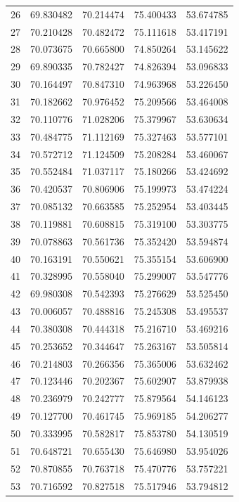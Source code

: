 \begin{table}
\begin{tabular}{rrrrr}
26 & 69.830482 & 70.214474 & 75.400433 & 53.674785 \\
27 & 70.210428 & 70.482472 & 75.111618 & 53.417191 \\
28 & 70.073675 & 70.665800 & 74.850264 & 53.145622 \\
29 & 69.890335 & 70.782427 & 74.826394 & 53.096833 \\
30 & 70.164497 & 70.847310 & 74.963968 & 53.226450 \\
31 & 70.182662 & 70.976452 & 75.209566 & 53.464008 \\
32 & 70.110776 & 71.028206 & 75.379967 & 53.630634 \\
33 & 70.484775 & 71.112169 & 75.327463 & 53.577101 \\
34 & 70.572712 & 71.124509 & 75.208284 & 53.460067 \\
35 & 70.552484 & 71.037117 & 75.180266 & 53.424692 \\
36 & 70.420537 & 70.806906 & 75.199973 & 53.474224 \\
37 & 70.085132 & 70.663585 & 75.252954 & 53.403445 \\
38 & 70.119881 & 70.608815 & 75.319100 & 53.303775 \\
39 & 70.078863 & 70.561736 & 75.352420 & 53.594874 \\
40 & 70.163191 & 70.550621 & 75.355154 & 53.606900 \\
41 & 70.328995 & 70.558040 & 75.299007 & 53.547776 \\
42 & 69.980308 & 70.542393 & 75.276629 & 53.525450 \\
43 & 70.006057 & 70.488816 & 75.245308 & 53.495537 \\
44 & 70.380308 & 70.444318 & 75.216710 & 53.469216 \\
45 & 70.253652 & 70.344647 & 75.263167 & 53.505814 \\
46 & 70.214803 & 70.266356 & 75.365006 & 53.632462 \\
47 & 70.123446 & 70.202367 & 75.602907 & 53.879938 \\
48 & 70.236979 & 70.242777 & 75.879564 & 54.146123 \\
49 & 70.127700 & 70.461745 & 75.969185 & 54.206277 \\
50 & 70.333995 & 70.582817 & 75.853780 & 54.130519 \\
51 & 70.648721 & 70.655430 & 75.646980 & 53.954026 \\
52 & 70.870855 & 70.763718 & 75.470776 & 53.757221 \\
53 & 70.716592 & 70.827518 & 75.517946 & 53.794812 \\

\end{tabular}
\end{table}
